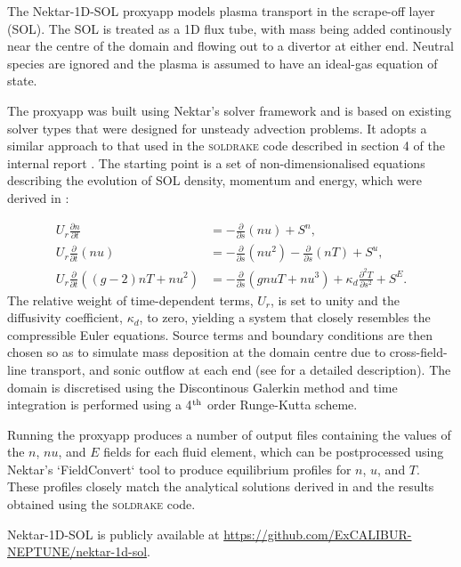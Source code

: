 
The Nektar-1D-SOL proxyapp models plasma transport in the scrape-off layer (SOL).
The SOL is treated as a 1D flux tube, with mass being added continously near the centre of the domain and flowing out to a divertor at either end.
Neutral species are ignored and the plasma is assumed to have an ideal-gas equation of state.

The proxyapp was built using Nektar's solver framework and is based on existing solver types that were designed for unsteady advection problems.
It adopts a similar approach to that used in the \textsc{soldrake} code described in section 4 of the internal report \cite{y3re222}.
The starting point is a set of non-dimensionalised equations describing the evolution of SOL density, momentum and energy, which were derived in \cite{detach-rp2}:

\begin{align}
    U_r \frac{\partial n}{\partial t} &= 
        - \frac{\partial }{\partial s}(nu)
        + S^n, \label{eqn:n}\\
    U_r \frac{\partial }{\partial t} (nu)&= 
        - \frac{\partial }{\partial s} (nu^2)
        - \frac{\partial }{\partial s} (nT)
        + S^u, \label{eqn:u} \\
    U_r \frac{\partial }{\partial t} \left( (g-2)nT + nu^2  \right) &= 
        - \frac{\partial }{\partial s}(gnuT + nu^3)
        + \kappa_d \frac{\partial^2  T}{\partial s^2}
        + S^E. \label{eqn:T}
\end{align}
The relative weight of time-dependent terms, $U_r$, is set to unity and the diffusivity coefficient, $\kappa_d$, to zero, yielding a system that closely resembles the compressible Euler equations.
Source terms and boundary conditions are then chosen so as to simulate mass deposition at the domain centre due to cross-field-line transport, and sonic outflow at each end (see \cite{y3re222} for a detailed description).
The domain is discretised using the Discontinous Galerkin method and time integration is performed using a 4$^{\rm th}$ order Runge-Kutta scheme.

Running the proxyapp produces a number of output files containing the values of the $n$, $nu$, and $E$ fields for each fluid element, which can be postprocessed using Nektar's `FieldConvert` tool to produce equilibrium profiles for $n$, $u$, and $T$.
These profiles closely match the analytical solutions derived in \cite{detach-rp2} and the results obtained using the \textsc{soldrake} code.

Nektar-1D-SOL is publicly available at \url{https://github.com/ExCALIBUR-NEPTUNE/nektar-1d-sol}.
